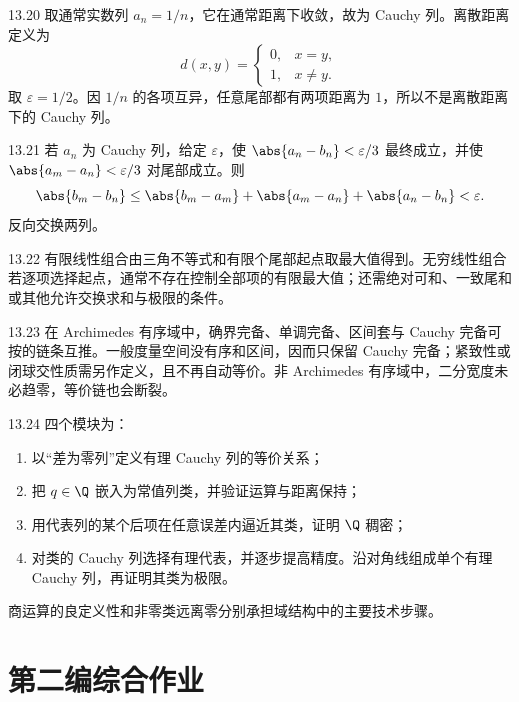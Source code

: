 \begin{solution}{13.20}
取通常实数列 \(a_n=1/n\)，它在通常距离下收敛，故为 Cauchy 列。离散距离定义为
\[
 d(x,y)=\begin{cases}0,&x=y,\\1,&x\ne y.\end{cases}
\]
取 \(\varepsilon=1/2\)。因 \(1/n\) 的各项互异，任意尾部都有两项距离为 \(1\)，所以不是离散距离下的 Cauchy 列。
\end{solution}

\begin{solution}{13.21}
若 \(a_n\) 为 Cauchy 列，给定 \(\varepsilon\)，使
\(\abs{a_n-b_n}<\varepsilon/3\) 最终成立，并使
\(\abs{a_m-a_n}<\varepsilon/3\) 对尾部成立。则
\[
 \abs{b_m-b_n}
 \le\abs{b_m-a_m}+\abs{a_m-a_n}+\abs{a_n-b_n}<\varepsilon.
\]
反向交换两列。
\end{solution}

\begin{solution}{13.22}
有限线性组合由三角不等式和有限个尾部起点取最大值得到。无穷线性组合若逐项选择起点，通常不存在控制全部项的有限最大值；还需绝对可和、一致尾和或其他允许交换求和与极限的条件。
\end{solution}

\begin{solution}{13.23}
在 Archimedes 有序域中，确界完备、单调完备、区间套与 Cauchy 完备可按的链条互推。一般度量空间没有序和区间，因而只保留 Cauchy 完备；紧致性或闭球交性质需另作定义，且不再自动等价。非 Archimedes 有序域中，二分宽度未必趋零，等价链也会断裂。
\end{solution}

\begin{solution}{13.24}
四个模块为：
\begin{enumerate}
 \item 以“差为零列”定义有理 Cauchy 列的等价关系；
 \item 把 \(q\in\Q\) 嵌入为常值列类，并验证运算与距离保持；
 \item 用代表列的某个后项在任意误差内逼近其类，证明 \(\Q\) 稠密；
 \item 对类的 Cauchy 列选择有理代表，并逐步提高精度。沿对角线组成单个有理 Cauchy 列，再证明其类为极限。
\end{enumerate}
商运算的良定义性和非零类远离零分别承担域结构中的主要技术步骤。
\end{solution}

\section*{第二编综合作业}

